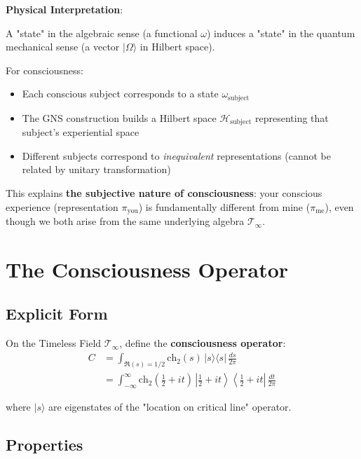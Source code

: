 \begin{level2}
\textbf{Physical Interpretation}:

A "state" in the algebraic sense (a functional $\omega$) induces a "state" in the quantum mechanical sense (a vector $|\Omega\rangle$ in Hilbert space).

For consciousness:
\begin{itemize}
\item Each conscious subject corresponds to a state $\omega_{\text{subject}}$
\item The GNS construction builds a Hilbert space $\mathcal{H}_{\text{subject}}$ representing that subject's experiential space
\item Different subjects correspond to \textit{inequivalent} representations (cannot be related by unitary transformation)
\end{itemize}

This explains \textbf{the subjective nature of consciousness}: your conscious experience (representation $\pi_{\text{you}}$) is fundamentally different from mine ($\pi_{\text{me}}$), even though we both arise from the same underlying algebra $\mathcal{T}_\infty$.
\end{level2}

\section{The Consciousness Operator}

\subsection{Explicit Form}

On the Timeless Field $\mathcal{T}_\infty$, define the \textbf{consciousness operator}:
\begin{equation}
\boxed{
\begin{aligned}
C &= \int_{\Re(s)=1/2} \text{ch}_2(s) \, |s\rangle\langle s| \, \frac{ds}{2\pi}\\
&= \int_{-\infty}^\infty \text{ch}_2\left(\frac{1}{2} + it\right) \, \left| \frac{1}{2} + it \right\rangle \left\langle \frac{1}{2} + it \right| \, \frac{dt}{2\pi}
\end{aligned}
}
\end{equation}

where $|s\rangle$ are eigenstates of the "location on critical line" operator.

\subsection{Properties}

